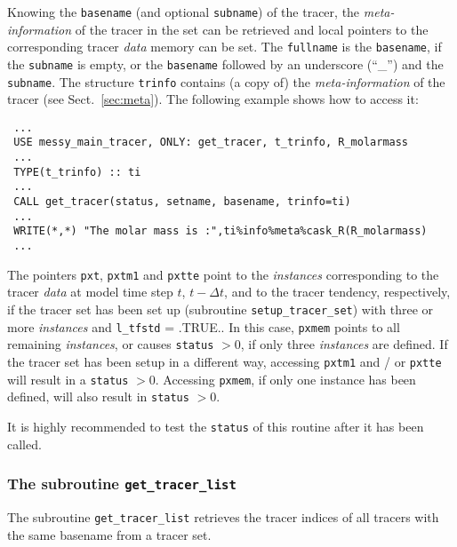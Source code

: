 \documentclass[twoside]{article}
\begin{document}
Knowing the {\tt basename} (and optional {\tt subname}) of the tracer,
the {\it meta-information} of the tracer in the set can be retrieved and
local pointers to the corresponding tracer {\it data} memory can be set.
%
The {\tt fullname} is the {\tt basename}, if the {\tt subname} is
empty, or the {\tt basename} followed by an underscore (``\_'') and the
{\tt subname}.
%
The structure {\tt trinfo} contains (a copy of) the 
{\it meta-information} of the tracer (see Sect.~\ref{sec:meta}).
The following example shows how to access it:
%
\begin{verbatim}
 ...
 USE messy_main_tracer, ONLY: get_tracer, t_trinfo, R_molarmass
 ...
 TYPE(t_trinfo) :: ti
 ...
 CALL get_tracer(status, setname, basename, trinfo=ti)
 ...
 WRITE(*,*) "The molar mass is :",ti%info%meta%cask_R(R_molarmass)
 ...
\end{verbatim}

The pointers {\tt pxt}, {\tt pxtm1} and {\tt pxtte} point to
the {\it instances} corresponding to the tracer {\it data} at model time
step $t$, $t-\Delta t$, and to the tracer tendency, respectively, if
the tracer set has been set up (subroutine {\tt setup\_tracer\_set})
with three or more {\it instances} and {\tt l\_tfstd} = .TRUE..
%
In this case, {\tt pxmem} points to all remaining {\it instances},
or causes {\tt status} $> 0$, if only three {\it instances} are defined.
%
If the tracer set has been setup in a different way, accessing
{\tt pxtm1} and / or {\tt pxtte} will result in a {\tt status}
$> 0$. 
%
Accessing {\tt pxmem}, if only one instance has been defined, will also
result in {\tt status} $> 0$.

It is highly recommended to test the {\tt status} of this routine after
it has been called.


\subsubsection{The subroutine {\tt get\_tracer\_list}}

The subroutine {\tt get\_tracer\_list} retrieves
the tracer indices of all tracers with the same basename from a tracer set.
\end{document}
